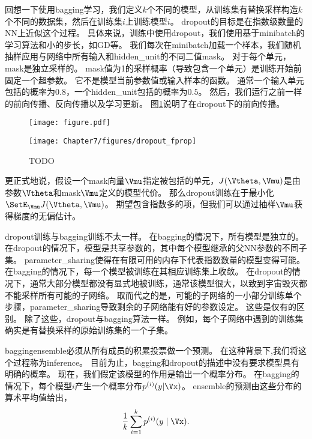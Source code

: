 
回想一下使用\gls{bagging}学习，我们定义$k$个不同的模型，从训练集有替换采样构造$k$个不同的数据集，然后在训练集$i$上训练模型$i$。
\gls{dropout}的目标是在指数级数量的\gls{NN}上近似这个过程。
具体来说，训练中使用\gls{dropout}，我们使用基于\gls{minibatch}的学习算法和小的步长，如\gls{GD}等。
我们每次在\gls{minibatch}加载一个样本，我们随机抽样应用与网络中所有输入和\gls{hidden_unit}的不同二值\gls{mask}。
对于每个单元，\gls{mask}是独立采样的。
\gls{mask}值为1的采样概率（导致包含一个单元）是训练开始前固定一个超参数。
它不是模型当前参数值或输入样本的函数。
通常一个输入单元包括的概率为$0.8$，一个\gls{hidden_unit}包括的概率为$0.5$。
然后，我们运行之前一样的前向传播、反向传播以及学习更新。
图\ref{fig:chap7_dropout_fprop}说明了在\gls{dropout}下的前向传播。
\begin{figure}[!htb]
\ifOpenSource
\centerline{\texttt{[image: figure.pdf]}}
\else
\centerline{\texttt{[image: Chapter7/figures/dropout\_fprop]}}
\fi
\caption{TODO}
\label{fig:chap7_dropout_fprop}
\end{figure}

更正式地说，假设一个\gls{mask}向量$\Vmu$指定被包括的单元，$J(\Vtheta, \Vmu)$是由参数$\Vtheta$和\gls{mask}$\Vmu$定义的模型代价。
那么\gls{dropout}训练在于最小化$\SetE_{\Vmu} J(\Vtheta, \Vmu)$。 
期望包含指数多的项，但我们可以通过抽样$\Vmu$获得梯度的无偏估计。

\gls{dropout}训练与\gls{bagging}训练不太一样。
在\gls{bagging}的情况下，所有模型是独立的。
在\gls{dropout}的情况下，模型是共享参数的，其中每个模型继承的父\gls{NN}参数的不同子集。
\gls{parameter_sharing}使得在有限可用的内存下代表指数数量的模型变得可能。
在\gls{bagging}的情况下，每一个模型被训练在其相应训练集上收敛。
在\gls{dropout}的情况下，通常大部分模型都没有显式地被训练，通常该模型很大，以致到宇宙毁灭都不能采样所有可能的子网络。
取而代之的是，可能的子网络的一小部分训练单个步骤，\gls{parameter_sharing}导致剩余的子网络能有好的参数设定。
这些是仅有的区别。
除了这些，\gls{dropout}与\gls{bagging}算法一样。
例如，每个子网络中遇到的训练集确实是有替换采样的原始训练集的一个子集。

\gls{bagging}\gls{ensemble}必须从所有成员的积累投票做一个预测。
在这种背景下,我们将这个过程称为\gls{inference}。
目前为止，\gls{bagging}和\gls{dropout}的描述中没有要求模型具有明确的概率。
现在，我们假定该模型的作用是输出一个概率分布。
在\gls{bagging}的情况下，每个模型$i$产生一个概率分布$p^{(i)}(y | \Vx)$。 
\gls{ensemble}的预测由这些分布的算术平均值给出，
\begin{align}
 \frac{1}{k} \sum_{i=1}^k p^{(i)}(y \mid \Vx).
\end{align}

